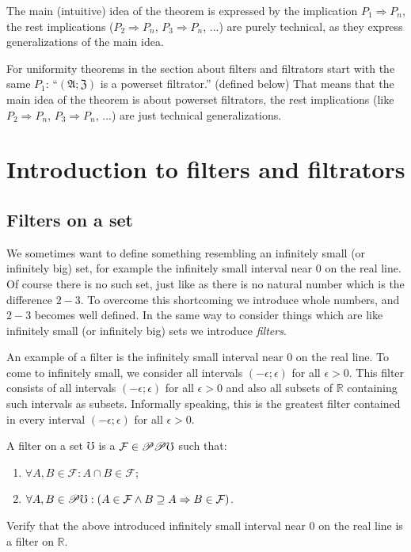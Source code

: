 The main (intuitive) idea of the theorem is expressed by the implication
$P_{1}\Rightarrow P_{n}$, the rest implications ($P_{2}\Rightarrow P_{n}$,
$P_{3}\Rightarrow P_{n}$, ...) are purely technical, as they express
generalizations of the main idea.

For uniformity theorems in the section about filters and filtrators
start with the same $P_{1}$: ``$(\mathfrak{A};\mathfrak{Z})$ is
a powerset filtrator.'' (defined below) That means that the main
idea of the theorem is about powerset filtrators, the rest implications
(like $P_{2}\Rightarrow P_{n}$, $P_{3}\Rightarrow P_{n}$, ...) are
just technical generalizations.


\section{Introduction to filters and filtrators}


\subsection{Filters on a set}

We sometimes want to define something resembling an infinitely small
(or infinitely big) set, for example the infinitely small interval
near $0$ on the real line. Of course there is no such set, just like
as there is no natural number which is the difference $2-3$. To overcome
this shortcoming we introduce whole numbers, and $2-3$ becomes well
defined. In the same way to consider things which are like infinitely
small (or infinitely big) sets we introduce \emph{filters}.

An example of a filter is the infinitely small interval near $0$
on the real line. To come to infinitely small, we consider all intervals
$(-\epsilon;\epsilon)$ for all $\epsilon>0$. This filter consists
of all intervals $(-\epsilon;\epsilon)$ for all $\epsilon>0$ and
also all subsets of $\mathbb{R}$ containing such intervals as subsets.
Informally speaking, this is the greatest filter contained in every
interval $(-\epsilon;\epsilon)$ for all $\epsilon>0$.
\begin{defn}
A filter on a set $\mho$ is a $\mathcal{F}\in\mathscr{P}\mathscr{P}\mho$
such that:
\begin{enumerate}
\item $\forall A,B\in\mathcal{F}:A\cap B\in\mathcal{F}$;
\item $\forall A,B\in\mathscr{P}\mho:(A\in\mathcal{F}\land B\supseteq A\Rightarrow B\in\mathcal{F})$.
\end{enumerate}
\end{defn}
\begin{xca}
Verify that the above introduced infinitely small interval near $0$
on the real line is a filter on $\mathbb{R}$.
\end{xca}

